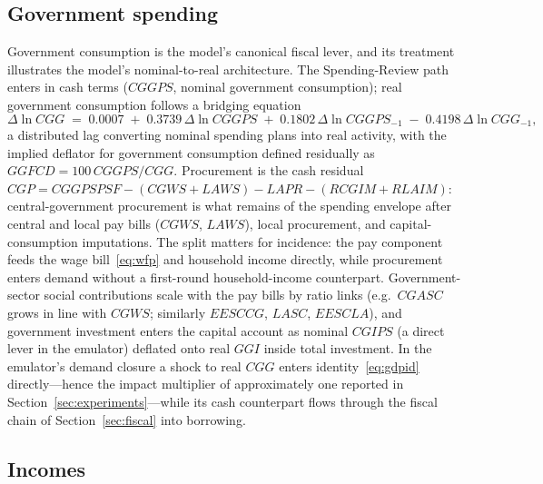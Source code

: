 \subsection{Government spending}
\label{sec:govspend}

Government consumption is the model's canonical fiscal lever, and its treatment illustrates the model's nominal-to-real architecture. The Spending-Review path enters in cash terms ($CGGPS$, nominal government consumption); real government consumption follows a bridging equation
\begin{equation}
\Delta \ln CGG \;=\; 0.0007 \;+\; 0.3739\,\Delta \ln CGGPS \;+\; 0.1802\,\Delta \ln CGGPS_{-1} \;-\; 0.4198\,\Delta \ln CGG_{-1},
\label{eq:cgg}
\end{equation}
a distributed lag converting nominal spending plans into real activity, with the implied deflator for government consumption defined residually as $GGFCD = 100\,CGGPS/CGG$. Procurement is the cash residual $CGP = CGGPSPSF - (CGWS + LAWS) - LAPR - (RCGIM + RLAIM)$: central-government procurement is what remains of the spending envelope after central and local pay bills ($CGWS$, $LAWS$), local procurement, and capital-consumption imputations. The split matters for incidence: the pay component feeds the wage bill~\eqref{eq:wfp} and household income directly, while procurement enters demand without a first-round household-income counterpart. Government-sector social contributions scale with the pay bills by ratio links (e.g.\ $CGASC$ grows in line with $CGWS$; similarly $EESCCG$, $LASC$, $EESCLA$), and government investment enters the capital account as nominal $CGIPS$ (a direct lever in the emulator) deflated onto real $GGI$ inside total investment. In the emulator's demand closure a shock to real $CGG$ enters identity~\eqref{eq:gdpid} directly---hence the impact multiplier of approximately one reported in Section~\ref{sec:experiments}---while its cash counterpart flows through the fiscal chain of Section~\ref{sec:fiscal} into borrowing.

\subsection{Incomes}

